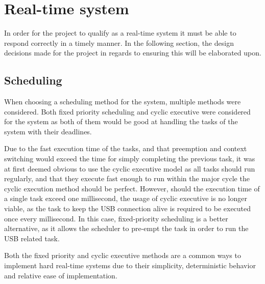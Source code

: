 \section{Real-time system}\label{Design:RTS} 
In order for the project to qualify as a real-time system it must be able to respond correctly in a timely manner.
In the following section, the design decisions made for the project in regards to ensuring this will be elaborated upon. 

\subsection{Scheduling}\label{Design:Scheduling}
When choosing a scheduling method for the system, multiple methods were considered. 
Both fixed priority scheduling and cyclic executive were considered for the system as both of them would be good at handling the tasks of the system with their deadlines.

Due to the fast execution time of the tasks, and that preemption and context switching would exceed the time for simply completing the previous task, it was at first deemed obvious to use the cyclic executive model as all tasks should run regularly, and that they execute fast enough to run within the major cycle the cyclic execution method should be perfect. 
However, should the execution time of a single task exceed one millisecond, the usage of cyclic executive is no longer viable, as the task to keep the USB connection alive is required to be executed once every millisecond.
In this case, fixed-priority scheduling is a better alternative, as it allows the scheduler to pre-empt the task in order to run the USB related task.

Both the fixed priority and cyclic executive methods are a common ways to implement hard real-time systems due to their simplicity, deterministic behavior and relative ease of implementation\cite{CyclicExecutionKimLarsen}.